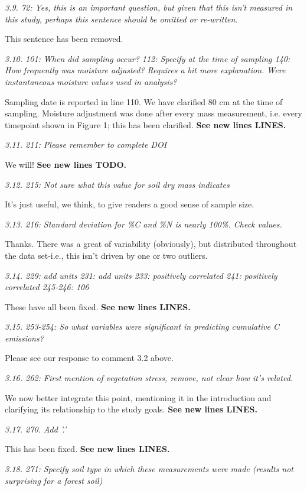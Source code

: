 \documentclass[11pt, oneside]{article}
\begin{document}
\medskip
{\it 3.9. 72: Yes, this is an important question, but given that this isn't measured in this study, perhaps this sentence should be omitted or re-written. }

This sentence has been removed.

\medskip
{\it 3.10. 101: When did sampling occur?
112: Specify at the time of sampling
140: How frequently was moisture adjusted? Requires a bit more explanation. Were instantaneous moisture values used in analysis? }

Sampling date is reported in line 110. We have clarified 80 cm at the time of sampling. Moisture adjustment was done after every mass measurement, i.e. every timepoint shown in Figure 1; this has been clarified. {\bf See new lines LINES.}

\medskip
{\it 3.11. 211: Please remember to complete DOI }

We will! {\bf See new lines TODO.}

\medskip
{\it 3.12. 215: Not sure what this value for soil dry mass indicates }

It's just useful, we think, to give readers a good sense of sample size.

\medskip
{\it 3.13. 216: Standard deviation for \%C and \%N is nearly 100\%. Check values. }

Thanks. There was a great of variability (obviously), but distributed throughout the data set-i.e., this isn't driven by one or two outliers.

\medskip
{\it 3.14. 229: add units
231: add units
233: positively correlated
241: positively correlated
245-246: 106 }

These have all been fixed. {\bf See new lines LINES.}

\medskip
{\it 3.15. 253-254: So what variables were significant in predicting cumulative C emissions? }

Please see our response to comment 3.2 above.

\medskip
{\it 3.16. 262: First mention of vegetation stress, remove, not clear how it's related. }

We now better integrate this point, mentioning it in the introduction and clarifying its relationship to the study goals. {\bf See new lines LINES.}

\medskip
{\it 3.17. 270. Add '.' }

This has been fixed. {\bf See new lines LINES.}

\medskip
{\it 3.18. 271: Specify soil type in which these measurements were made (results not surprising for a forest soil) }
\end{document}
